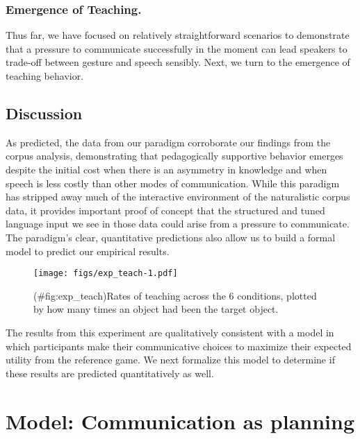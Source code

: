 \documentclass[english,,man,floatsintext]{apa6}
\begin{document}
\hypertarget{emergence-of-teaching.}{%
\subsubsection{Emergence of Teaching.}\label{emergence-of-teaching.}}

Thus far, we have focused on relatively straightforward scenarios to demonstrate that a pressure to communicate successfully in the moment can lead speakers to trade-off between gesture and speech sensibly. Next, we turn to the emergence of teaching behavior.

\hypertarget{discussion-1}{%
\subsection{Discussion}\label{discussion-1}}

As predicted, the data from our paradigm corroborate our findings from the corpus analysis, demonstrating that pedagogically supportive behavior emerges despite the initial cost when there is an asymmetry in knowledge and when speech is less costly than other modes of communication. While this paradigm has stripped away much of the interactive environment of the naturalistic corpus data, it provides important proof of concept that the structured and tuned language input we see in those data could arise from a pressure to communicate. The paradigm's clear, quantitative predictions also allow us to build a formal model to predict our empirical results.

\begin{figure}
\centering
\texttt{[image: figs/exp\_teach-1.pdf]}
\caption{(\#fig:exp\_teach)Rates of teaching across the 6 conditions, plotted by how many times an object had been the target object.}
\end{figure}

The results from this experiment are qualitatively consistent with a model in which participants make their communicative choices to maximize their expected utility from the reference game. We next formalize this model to determine if these results are predicted quantitatively as well.

\newcommand{\E}[1]{\mathbb{E}\left[ #1 \right]}

\hypertarget{model-communication-as-planning}{%
\section{Model: Communication as planning}\label{model-communication-as-planning}}
\end{document}
